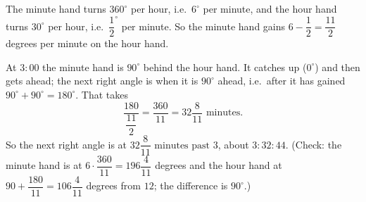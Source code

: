 The minute hand turns $360^\circ$ per hour, i.e.\ $6^\circ$ per minute, and the hour hand turns $30^\circ$ per hour, i.e.\ $\dfrac{1}{2}^\circ$ per minute. So the minute hand gains $6-\dfrac{1}{2}=\dfrac{11}{2}$ degrees per minute on the hour hand.

At $3{:}00$ the minute hand is $90^\circ$ behind the hour hand. It catches up ($0^\circ$) and then gets ahead; the next right angle is when it is $90^\circ$ ahead, i.e.\ after it has gained $90^\circ+90^\circ=180^\circ$. That takes
\[
\dfrac{180}{\dfrac{11}{2}}=\dfrac{360}{11}=32\dfrac{8}{11}\text{ minutes}.
\]
So the next right angle is at $\boxed{32\dfrac{8}{11}\text{ minutes past }3}$, about $3{:}32{:}44$. (Check: the minute hand is at $6\cdot\dfrac{360}{11}=196\dfrac{4}{11}$ degrees and the hour hand at $90+\dfrac{180}{11}=106\dfrac{4}{11}$ degrees from $12$; the difference is $90^\circ$.)

